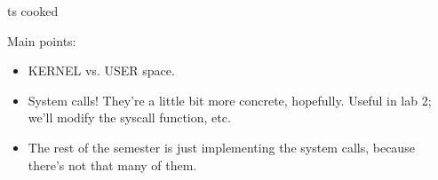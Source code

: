 ts cooked

Main points:
\begin{itemize}
    \item KERNEL vs. USER space.
    \item System calls!  They're a little bit more concrete, hopefully.
    Useful in lab 2; we'll modify the syscall function, etc.
    \item The rest of the semester is just
    implementing the system calls,
    because there's not that many of them.
\end{itemize}

